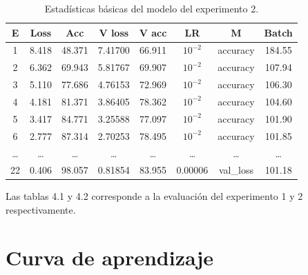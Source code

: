 \begin{table}[ht]
    \small
    \begin{center}
        \begin{tabular}{|c|c|c|c|c|c|c|c|} \hline
        E & Loss & Acc & V loss & V acc & LR & M & Batch \\ \hline
        1 & 8.418 & 48.371 & 7.41700 & 66.911 & $10^{-2}$ & accuracy & 184.55 \\ \hline
        2 & 6.362 & 69.943 & 5.81767 & 69.907 & $10^{-2}$ & accuracy & 107.94 \\ \hline
        3 & 5.110 & 77.686 & 4.76153 & 72.969 & $10^{-2}$ & accuracy & 106.30 \\ \hline
        4 & 4.181 & 81.371 & 3.86405 & 78.362 & $10^{-2}$ & accuracy & 104.60 \\ \hline
        5 & 3.417 & 84.771 & 3.25588 & 77.097 & $10^{-2}$ & accuracy & 101.90 \\ \hline
        6 & 2.777 & 87.314 & 2.70253 & 78.495 & $10^{-2}$ & accuracy & 101.85 \\ \hline
        \dots & \dots & \dots & \dots & \dots & \dots & \dots & \dots \\ \hline
        22 & 0.406 & 98.057 & 0.81854 & 83.955 & 0.00006 & val\_loss & 101.18 \\ \hline
        \end{tabular}
        \caption{Estadísticas básicas del modelo del experimento 2.}
    \end{center}\label{fig:estadisticas_p2}
\end{table}
 
Las tablas 4.1 y 4.2 corresponde a la evaluación del experimento 1 y 2 respectivamente.

\section*{Curva de aprendizaje}

